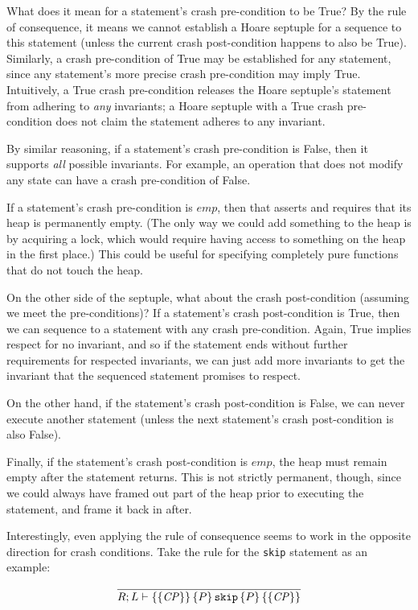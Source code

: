 What does it mean for a statement's crash pre-condition to be True? By the rule
of consequence, it means we cannot establish a Hoare septuple for a sequence
to this statement (unless the current crash post-condition happens to also be
True).
Similarly, a crash pre-condition of True may be established for any
statement, since any statement's more precise crash pre-condition may imply
True.
Intuitively, a True crash pre-condition releases the Hoare septuple's
statement from adhering to \textit{any} invariants; a Hoare septuple with a
True crash pre-condition does not claim the statement adheres to any invariant.

By similar reasoning, if a statement's crash pre-condition is False, then it
supports \textit{all} possible invariants.
For example, an operation that does
not modify any state can have a crash pre-condition of False.

If a statement's crash pre-condition is $\mathit{emp}$, then that asserts and requires
that its heap is permanently empty.
(The only way we could add something to the
heap is by acquiring a lock, which would require having access to something on
the heap in the first place.)
This could be useful for specifying completely
pure functions that do not touch the heap.

On the other side of the septuple, what about the crash post-condition
(assuming we meet the pre-conditions)? If a statement's crash post-condition
is True, then we can sequence to a statement with any crash pre-condition.
Again, True implies respect for no invariant, and so if the statement ends
without further requirements for respected invariants, we can just add more
invariants to get the invariant that the sequenced statement promises to
respect.

On the other hand, if the statement's crash post-condition is False, we can
never execute another statement (unless the next statement's crash
post-condition is also False).

Finally, if the statement's crash post-condition is $\mathit{emp}$,
the heap must remain
empty after the statement returns.
This is not strictly permanent, though,
since we could always have framed out part of the heap prior to executing the
statement, and frame it back in after.

Interestingly, even applying the rule of consequence seems to work in the
opposite direction for crash conditions.
Take the rule for the \texttt{skip}
statement as an example:

\begin{gather*}
    \infer{\hoarestmt{R}{L}{\mathit{CP}}{P}{\texttt{skip}}{P}{\mathit{CP}}}{}
\end{gather*}

